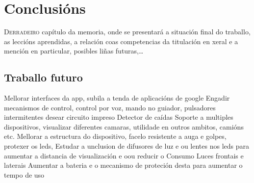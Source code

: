 \chapter{Conclusións}
\label{chap:conclusions}

\lettrine{D}{erradeiro} capítulo da memoria, onde se presentará a
situación final do traballo, as leccións aprendidas, a relación coas
competencias da titulación en xeral e a mención en particular,
posibles liñas futuras,\dots
\section{Traballo futuro}
Mellorar interfaces da app, subila a tenda de aplicacións de google
Engadir mecanismos de control, control por voz, mando no guiador, pulsadores intermitentes
desear circuito impreso
Detector de caídas
Soporte a multiples dispositivos, visualizar diferentes camaras, utilidade en outros ambitos, camións etc.
Mellorar a estructura do dispositivo, facelo resistente a auga e golpes, protexer os leds,
Estudar a unclusion de difusores de luz e ou lentes nos leds para aumentar a distancia de visualización e oou reducir o Consumo
Luces frontais e laterais
Aumentar a bateria e o mecanismo de proteción desta para aumentar o tempo de uso
